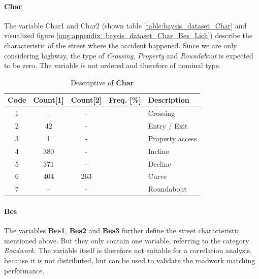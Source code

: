\paragraph{Char}
The variable Char1 and Char2 (shown table \autoref{table:baysis_dataset_Char} and visualized figure \autoref{img:appendix_baysis_dataset_Char_Bes_Lich}) describe the characteristic of the street where the accident happened. Since we are only considering highway, the type of \textit{Crossing}, \textit{Property} and \textit{Roundabout} is expected to be zero. The variable is not ordered and therefore of nominal type.  
\begin{table}[ht]
	\centering
	\small
	\begin{tabular}{c|c|c|c|l}
		\toprule
		Code & Count[1] & Count[2] & Freq. [\%] & Description \\ 
		\midrule
		1 & - 	& -		&	& Crossing \\
	    2 & 42	& -		&	& Entry / Exit \\
	    3 & 1	& -		&	& Property access \\
	    4 & 380	& -		&	& Incline \\
	    5 & 371	& -		&	& Decline \\
	    6 & 404	& 263	&	& Curve \\
		7 & -	& -		&	& Roundabout \\
		\bottomrule
	\end{tabular}
	\caption{Descriptive of \textbf{Char}}
	\label{table:baysis_dataset_Char}
	\vspace{-8mm}
\end{table}

\paragraph{Bes}
The variables \textbf{Bes1}, \textbf{Bes2} and \textbf{Bes3} further define the street characteristic mentioned above. But they only contain one variable, referring to the category \textit{Roadwork}. The variable itself is therefore not suitable for a correlation analysis, because it is not distributed, but can be used to validate the roadwork matching performance.

